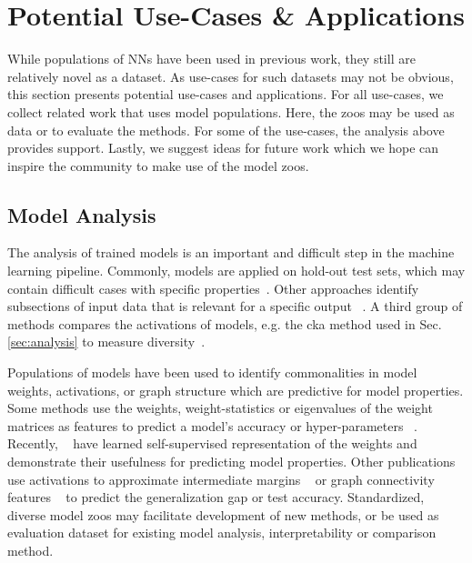 \section{Potential Use-Cases \& Applications}
\label{sec:usecases}
While populations of NNs have been used in previous work, they still are relatively novel as a dataset. As use-cases for such datasets may not be obvious, this section presents potential use-cases and applications. For all use-cases, we collect related work that uses model populations. Here, the zoos may be used as data or to evaluate the methods. For some of the use-cases, the analysis above provides support. Lastly, we suggest ideas for future work which we hope can inspire the community to make use of the model zoos. 

\subsection{Model Analysis}
The analysis of trained models is an important and difficult step in the machine learning pipeline. 
Commonly, models are applied on hold-out test sets, which may contain difficult cases with specific properties~\citep{lecunDeepLearning2015}. 
Other approaches identify subsections of input data that is relevant for a specific output ~\citep{yosinskiUnderstandingNeuralNetworks2015,karpathyVisualizingUnderstandingRecurrent2015,zintgrafVisualizingDeepNeural2017}. 
A third group of methods compares the activations of models, e.g. the cka method used in Sec. \ref{sec:analysis} to measure diversity~\citep{kornblithSimilarityNeuralNetwork2019}.

Populations of models have been used to identify commonalities in model weights, activations, or graph structure which are predictive for model properties. 
Some methods use the weights, weight-statistics or eigenvalues of the weight matrices as features to predict a model's accuracy or hyper-parameters ~\citep{unterthinerPredictingNeuralNetwork2020,eilertsenClassifyingClassifierDissecting2020,martinTraditionalHeavyTailedSelf2019}. Recently, ~\citep{schurholtSelfSupervisedRepresentationLearning2021} have learned self-supervised representation of the weights and demonstrate their usefulness for predicting model properties. Other publications use activations to approximate intermediate margins ~\citep{yakTaskArchitectureIndependentGeneralization2019, jiangPredictingGeneralizationGap2019} or graph connectivity features ~\citep{corneanuComputingTestingError2020} to predict the generalization gap or test accuracy. 
Standardized, diverse model zoos may facilitate development of new methods, or be used as evaluation dataset for existing model analysis, interpretability or comparison method.
 
